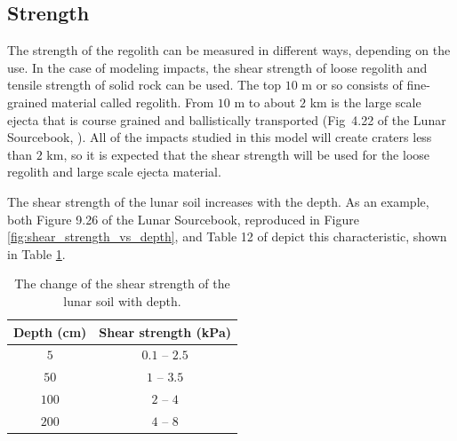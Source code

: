 \documentclass{article}
\begin{document}
\subsection{Strength}

The strength of the regolith can be measured in different ways, depending on the use. In the case of modeling impacts, the shear strength \citep[see Section 3 of][]{housen2011ejecta} of loose regolith and tensile strength of solid rock can be used. The top $10$ m or so consists of fine-grained material called regolith. From $10$ m to about $2$ km is the large scale ejecta that is course grained and ballistically transported (Fig~4.22 of the Lunar Sourcebook, \cite{heiken1991lunar}). All of the impacts studied in this model will create craters less than $2$ km, so it is expected that the shear strength will be used for the loose regolith and large scale ejecta material.

The shear strength of the lunar soil increases with the depth. As an example, both Figure 9.26 of the Lunar Sourcebook, reproduced in Figure \ref{fig:shear_strength_vs_depth}, and Table 12 of \cite{slyuta2014physical} depict this characteristic, shown in Table \ref{tab:shear_strength}.

\begin{table}[!htb]
	\begin{center}
		\caption{The change of the shear strength of the lunar soil with depth.}
		\label{tab:shear_strength}
		\begin{tabular}{c c}
			\hline
			Depth (cm)  & Shear strength (kPa)  \\
			\hline
			$5$  & $0.1$ -- $2.5$  \\
			$50$  & $1$ -- $3.5$   \\
			$100$ & $2$ -- $4$  \\
			$200$  & $4$ -- $8$  \\\hline
		\end{tabular}
	\end{center}
\end{table}
\end{document}
